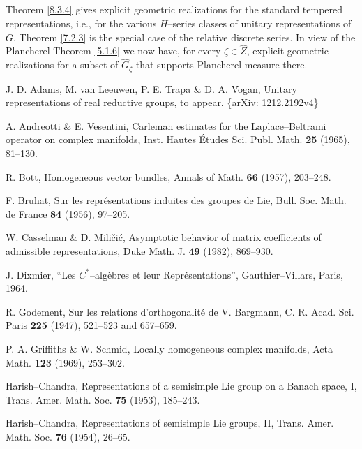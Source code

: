 \documentclass{conm-p-l}
\begin{document}
\subsection{}\label{ssec8d}\setcounter{equation}{0}
Theorem \ref{8.3.4} gives explicit geometric realizations for the
standard tempered representations, i.e., for the various $H$--series
classes of unitary representations of $G$.  Theorem \ref{7.2.3} is the 
special case of the relative discrete series.  In view of the Plancherel 
Theorem \ref{5.1.6} we now have, for every $\zeta \in \widehat{Z}$,
explicit geometric realizations for a subset of $\widehat{G}_\zeta$ that
supports Plancherel measure there.
\vfill\pagebreak

\begin{thebibliography}{XX}

J. D. Adams, M. van Leeuwen, P. E. Trapa \& D. A. Vogan,
Unitary representations of real reductive groups, to appear.
\{arXiv: 1212.2192v4\}

A. Andreotti \& E. Vesentini,
Carleman estimates for the Laplace--Beltrami operator on complex manifolds,
Inst. Hautes \'Etudes Sci. Publ. Math. {\bf 25} (1965), 81--130.

R. Bott,
Homogeneous vector bundles, Annals of Math. {\bf 66} (1957), 
203--248.

F. Bruhat,
Sur les repr\'esentations induites des groupes de Lie,
Bull. Soc. Math. de France {\bf 84} (1956), 97--205.

W. Casselman \& D. Mili\v{c}i\'c, 
Asymptotic behavior of matrix coefficients of admissible representations, 
Duke Math. J. {\bf 49} (1982), 869--930.

J. Dixmier, 
``Les $C^*$--alg\`ebres et leur Repr\'esentations'',
Gauthier--Villars, Paris, 1964.

R. Godement,
Sur les relations d'orthogonalit\'e de V. Bargmann,
C. R. Acad. Sci. Paris {\bf 225} (1947), 521--523 and 657--659.

P. A. Griffiths \& W. Schmid,
Locally homogeneous complex manifolds, Acta Math. {\bf 123} (1969), 253--302.

Harish--Chandra,
Representations of a semisimple Lie group on a Banach space, I,
Trans. Amer. Math. Soc. {\bf 75} (1953), 185--243.

Harish--Chandra,
Representations of semisimple Lie groups, II,
Trans. Amer. Math. Soc. {\bf 76} (1954), 26--65.


\end{thebibliography}
\end{document}
